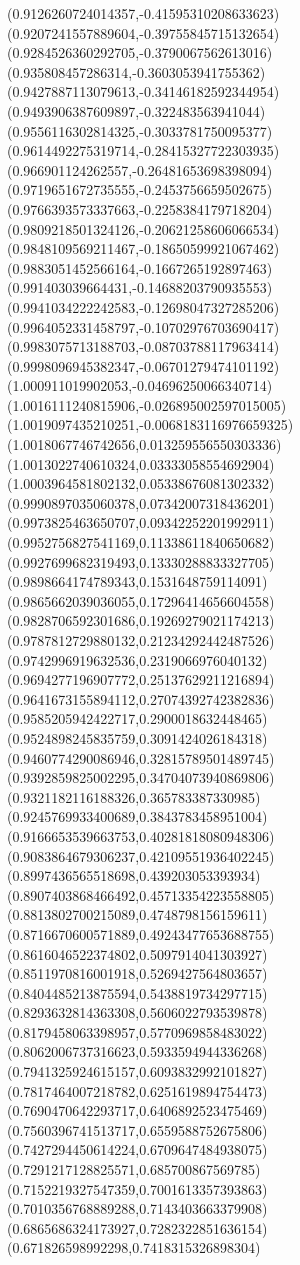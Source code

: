 {(0.9126260724014357,-0.41595310208633623)
(0.9207241557889604,-0.39755845715132654)
(0.9284526360292705,-0.3790067562613016)
(0.935808457286314,-0.3603053941755362)
(0.9427887113079613,-0.34146182592344954)
(0.9493906387609897,-0.322483563941044)
(0.9556116302814325,-0.3033781750095377)
(0.9614492275319714,-0.28415327722303935)
(0.966901124262557,-0.26481653698398094)
(0.9719651672735555,-0.2453756659502675)
(0.9766393573337663,-0.2258384179718204)
(0.9809218501324126,-0.20621258606066534)
(0.9848109569211467,-0.18650599921067462)
(0.9883051452566164,-0.1667265192897463)
(0.991403039664431,-0.14688203790935553)
(0.9941034222242583,-0.12698047327285206)
(0.9964052331458797,-0.10702976703690417)
(0.9983075713188703,-0.08703788117963414)
(0.9998096945382347,-0.06701279474101192)
(1.000911019902053,-0.04696250066340714)
(1.0016111240815906,-0.026895002597015005)
(1.0019097435210251,-0.0068183116976659325)
(1.0018067746742656,0.013259556550303336)
(1.0013022740610324,0.03333058554692904)
(1.0003964581802132,0.05338676081302332)
(0.9990897035060378,0.07342007318436201)
(0.9973825463650707,0.09342252201992911)
(0.9952756827541169,0.11338611840650682)
(0.9927699682319493,0.13330288833327705)
(0.9898664174789343,0.1531648759114091)
(0.9865662039036055,0.17296414656604558)
(0.9828706592301686,0.19269279021174213)
(0.9787812729880132,0.21234292442487526)
(0.9742996919632536,0.2319066976040132)
(0.9694277196907772,0.25137629211216894)
(0.9641673155894112,0.27074392742382836)
(0.9585205942422717,0.2900018632448465)
(0.9524898245835759,0.3091424026184318)
(0.9460774290086946,0.32815789501489745)
(0.9392859825002295,0.34704073940869806)
(0.9321182116188326,0.365783387330985)
(0.9245769933400689,0.3843783458951004)
(0.9166653539663753,0.40281818080948306)
(0.9083864679306237,0.42109551936402245)
(0.8997436565518698,0.439203053393934)
(0.8907403868466492,0.45713354223558805)
(0.8813802700215089,0.4748798156159611)
(0.8716670600571889,0.49243477653688755)
(0.8616046522374802,0.5097914041303927)
(0.8511970816001918,0.5269427564803657)
(0.8404485213875594,0.5438819734297715)
(0.8293632814363308,0.5606022793539878)
(0.8179458063398957,0.5770969858483022)
(0.8062006737316623,0.5933594944336268)
(0.7941325924615157,0.6093832992101827)
(0.7817464007218782,0.6251619894754473)
(0.7690470642293717,0.6406892523475469)
(0.7560396741513717,0.6559588752675806)
(0.7427294450614224,0.6709647484938075)
(0.7291217128825571,0.685700867569785)
(0.7152219327547359,0.7001613357393863)
(0.7010356768889288,0.7143403663379908)
(0.6865686324173927,0.7282322851636154)
(0.671826598992298,0.7418315326898304)
}
